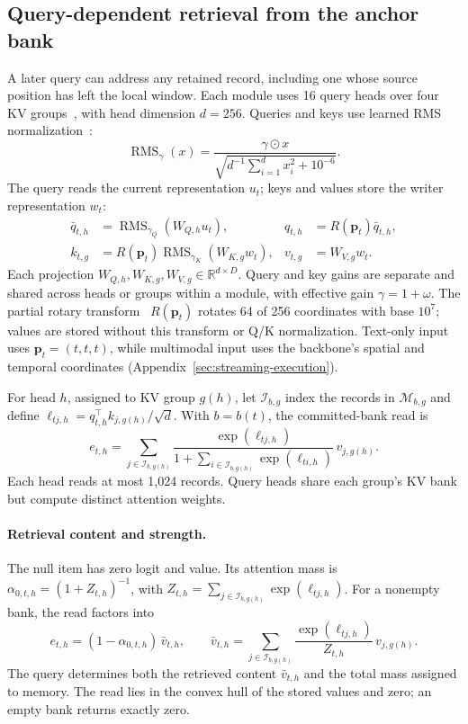 \subsection{Query-dependent retrieval from the anchor bank}
\label{sec:read}

A later query can address any retained record, including one whose source position has left the local window. Each module uses 16 query heads over four KV groups~\cite{gqa}, with head dimension $d=256$. Queries and keys use learned RMS normalization~\cite{rmsnorm,yanchorcode,yanchorconfig}:
\begin{equation}
\operatorname{RMS}_{\gamma}(x)=\frac{\gamma\odot x}{\sqrt{d^{-1}\sum_{i=1}^{d}x_i^2+10^{-6}}}.
\end{equation}
The query reads the current representation $u_t$; keys and values store the writer representation $w_t$:
\begin{align}
\bar q_{t,h}&=\operatorname{RMS}_{\gamma_Q}(W_{Q,h}u_t),
&q_{t,h}&=R(\mathbf p_t)\bar q_{t,h},\\
k_{t,g}&=R(\mathbf p_t)\operatorname{RMS}_{\gamma_K}(W_{K,g}w_t),
&v_{t,g}&=W_{V,g}w_t.
\label{eq:memory-qkv}
\end{align}
Each projection $W_{Q,h},W_{K,g},W_{V,g}\in\mathbb R^{d\times D}$. Query and key gains are separate and shared across heads or groups within a module, with effective gain $\gamma=1+\omega$. The partial rotary transform~\cite{roformer} $R(\mathbf p_t)$ rotates 64 of 256 coordinates with base $10^7$; values are stored without this transform or Q/K normalization. Text-only input uses $\mathbf p_t=(t,t,t)$, while multimodal input uses the backbone's spatial and temporal coordinates (Appendix~\ref{sec:streaming-execution}).

For head $h$, assigned to KV group $g(h)$, let $\mathcal I_{b,g}$ index the records in $\mathcal M_{b,g}$ and define $\ell_{tj,h}=q_{t,h}^{\top}k_{j,g(h)}/\sqrt d$. With $b=b(t)$, the committed-bank read is
\begin{equation}
e_{t,h}=\sum_{j\in\mathcal I_{b,g(h)}}
\frac{\exp(\ell_{tj,h})}
{1+\sum_{i\in\mathcal I_{b,g(h)}}\exp(\ell_{ti,h})}\,v_{j,g(h)}.
\end{equation}
Each head reads at most 1,024 records. Query heads share each group's KV bank but compute distinct attention weights.

\paragraph{Retrieval content and strength.}
The null item has zero logit and value. Its attention mass is $\alpha_{0,t,h}=(1+Z_{t,h})^{-1}$, with $Z_{t,h}=\sum_{j\in\mathcal I_{b,g(h)}}\exp(\ell_{tj,h})$. For a nonempty bank, the read factors into
\begin{equation}
e_{t,h}=(1-\alpha_{0,t,h})\,\bar v_{t,h},
\qquad
\bar v_{t,h}=\sum_{j\in\mathcal I_{b,g(h)}}
\frac{\exp(\ell_{tj,h})}{Z_{t,h}}\,v_{j,g(h)}.
\label{eq:retrieval-factorization}
\end{equation}
The query determines both the retrieved content $\bar v_{t,h}$ and the total mass assigned to memory. The read lies in the convex hull of the stored values and zero; an empty bank returns exactly zero.

